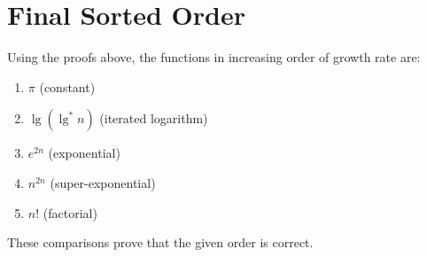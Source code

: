 \documentclass{article}
\begin{document}
\section{Final Sorted Order}

Using the proofs above, the functions in increasing order of growth rate are:

\begin{enumerate}
    \item \( \pi \) (constant)
    \item \( \lg(\lg^*n) \) (iterated logarithm)
    \item \( e^{2n} \) (exponential)
    \item \( n^{2n} \) (super-exponential)
    \item \( n! \) (factorial)
\end{enumerate}

These comparisons prove that the given order is correct.
\end{document}
